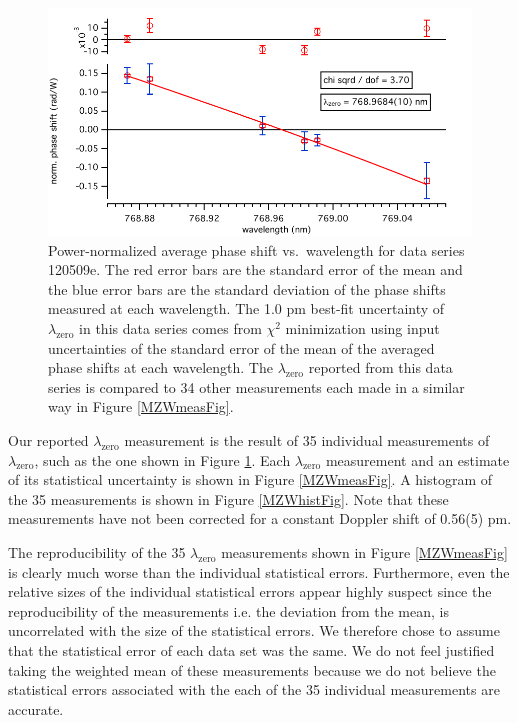 \begin{figure}
\centerline{\includegraphics[width=.90\textwidth]{Figures/120509eMZWmeas.pdf}}
\caption[Power-normalized average phase shift vs.~wavelength for data series 120509e.]{\label{MZWphaseVsWave}Power-normalized average phase shift vs.~wavelength for data series 120509e. The red error bars are the standard error of the mean and the blue error bars are the standard deviation of the phase shifts measured at each wavelength. The 1.0 pm best-fit uncertainty of $\lambda_\textrm{zero}$ in this data series comes from $\chi^2$ minimization using input uncertainties of the standard error of the mean of the averaged phase shifts at each wavelength. The $\lambda_\textrm{zero}$ reported from this data series is compared to 34 other measurements each made in a similar way in Figure \ref{MZWmeasFig}.}
\end{figure}


Our reported $\lambda_\textrm{zero}$ measurement is the result of 35 individual measurements of $\lambda_\textrm{zero}$, such as the one shown in Figure \ref{MZWphaseVsWave}. Each $\lambda_\textrm{zero}$ measurement and an estimate of its statistical uncertainty is shown in Figure \ref{MZWmeasFig}. A histogram of the 35 measurements is shown in Figure \ref{MZWhistFig}. Note that these measurements have not been corrected for a constant Doppler shift of 0.56(5) pm. 


The reproducibility of the 35 $\lambda_\textrm{zero}$ measurements shown in Figure \ref{MZWmeasFig} is clearly much worse than the individual statistical errors. Furthermore, even the relative sizes of the individual statistical errors appear highly suspect since the reproducibility of the measurements i.e. the deviation from the mean, is uncorrelated with the size of the statistical errors. We therefore chose to assume that the statistical error of each data set was the same. We do not feel justified taking the weighted mean of these measurements because we do not believe the statistical errors associated with the each of the 35 individual measurements are accurate.


